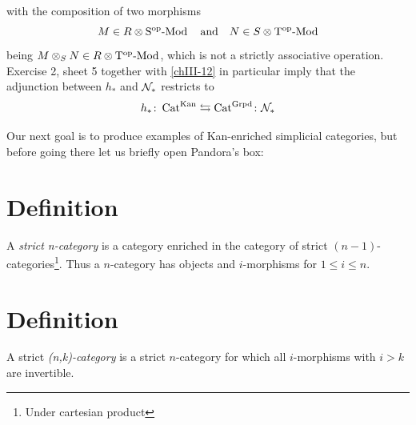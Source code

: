 \begin{enumerate}[label=\roman*)]
\begin{equation*}
                \end{equation*}
                with the composition of two morphisms
                \begin{equation*}
                    M \in R \otimes \operatorname{S^{\operatorname{op}}-Mod} \quad \text{and} \quad N \in S \otimes \operatorname{T^{\operatorname{op}}-Mod}
                \end{equation*}
                being $M \otimes_S N \in R \otimes \operatorname{T^{\operatorname{op}}-Mod}$, which is not a strictly associative operation.\\
                Exercise 2, sheet 5 together with \ref{chIII-12} in particular imply that the adjunction between $h_{*}$ and $\mathcal{N}_{*}$ restricts to
                \begin{equation*}
                    h_{*} \colon \operatorname{Cat}^{\operatorname{Kan}} \leftrightarrows \operatorname{Cat}^{\operatorname{Grpd}} \colon \mathcal{N}_{*}
                \end{equation*}
        \end{enumerate}

        Our next goal is to produce examples of Kan-enriched simplicial categories, but before going there let us briefly open Pandora's box:

        \section{Definition}
            A \emph{strict n-category} is a category enriched in the category of strict $(n-1)$-categories\footnote{Under cartesian product}.
            \smallskip
            Thus a $n$-category has objects and $i$-morphisms for $1 \leq i \leq n$.

        \section{Definition}
            A strict \emph{(n,k)-category} is a strict $n$-category for which all $i$-morphisms with $i > k$ are invertible.
            \smallskip

